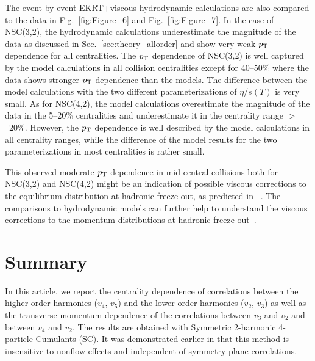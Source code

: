 The event-by-event EKRT+viscous hydrodynamic calculations are also compared to the data in Fig.~\ref{fig:Figure_6} and Fig.~\ref{fig:Figure_7}.
In the case of NSC(3,2), the hydrodynamic calculations underestimate the magnitude of the data as discussed in Sec.~\ref{sec:theory_allorder} and show very weak $p_{\rm T}$ dependence for all centralities.
The $p_{\rm T}$ dependence of NSC(3,2) is well captured by the model calculations in all collision centralities except for 40--50\% where the data shows stronger $p_{\rm T}$ dependence than the models. The difference between the model calculations with the two different parameterizations of $\eta/s(T)$ is very small. 
As for NSC(4,2), the model calculations overestimate the magnitude of the data in the 5--20\% centralities and underestimate it in the centrality range $>$~20\%. However, the $p_{\rm T}$ dependence is well described by the model calculations in all centrality ranges, while the difference of the model results for the two parameterizations in most centralities is rather small.

This observed moderate $p_{\rm T}$ dependence in mid-central collisions both for NSC(3,2) and NSC(4,2) might be an indication of possible viscous corrections to the equilibrium distribution at hadronic freeze-out, as predicted in ~\cite{Niemi:2012aj}.
The comparisons to hydrodynamic models can further help to understand the viscous corrections to the momentum distributions at hadronic freeze-out~\cite{Dusling:2009df,Luzum:2010ad,Teaney:2012ke,Molnar:2014fva,Niemi:2015qia}.


 
\section{Summary}
\label{sec:summary}
In this article, we report the centrality dependence of correlations between the higher order harmonics ($v_4$, $v_5$) and the lower order harmonics ($v_2$, $v_3$) as well as the transverse momentum dependence of the correlations between $v_3$ and $v_2$ and between $v_4$ and $v_2$.
The results are obtained with Symmetric 2-harmonic 4-particle Cumulants (SC). It was demonstrated earlier in \cite{ALICE:2016kpq} that this method is insensitive to nonflow effects and independent of symmetry plane correlations.


